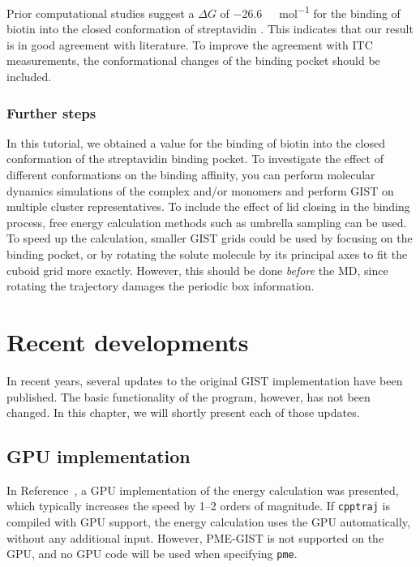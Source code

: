 \documentclass[9pt,tutorial]{livecoms}
\newcommand{\software}{\texttt}
\newcommand\inlinecode{\texttt}
\begin{document}
Prior computational studies suggest a $\Delta G$ of \SI{-26.6}{\kilo\calorie\per\mole} for the binding of biotin into the closed conformation of streptavidin \cite{Bansal2018-biotin}.
This indicates that our result is in good agreement with literature.
To improve the agreement with ITC measurements, the conformational changes of the binding pocket should be included.

\subsubsection{Further steps}
In this tutorial, we obtained a value for the binding of biotin into the closed conformation of the streptavidin binding pocket.
To investigate the effect of different conformations on the binding affinity, you can perform molecular dynamics simulations of the complex and/or monomers and perform GIST on multiple cluster representatives.
To include the effect of lid closing in the binding process, free energy calculation methods such as umbrella sampling can be used.
To speed up the calculation, smaller GIST grids could be used by focusing on the binding pocket, or by rotating the solute molecule by its principal axes to fit the cuboid grid more exactly.
However, this should be done \emph{before} the MD, since rotating the trajectory damages the periodic box information.

\section{Recent developments}
In recent years, several updates to the original GIST implementation have been published.
The basic functionality of the program, however, has not been changed.
In this chapter, we will shortly present each of those updates.
\subsection{GPU implementation}
In Reference~\cite{Kraml2020}, a GPU implementation of the energy calculation was presented, which typically increases the speed by 1--2 orders of magnitude.
If \software{cpptraj} is compiled with GPU support, the energy calculation uses the GPU automatically, without any additional input.
However, PME-GIST is not supported on the GPU, and no GPU code will be used when specifying \inlinecode{pme}.
\end{document}
